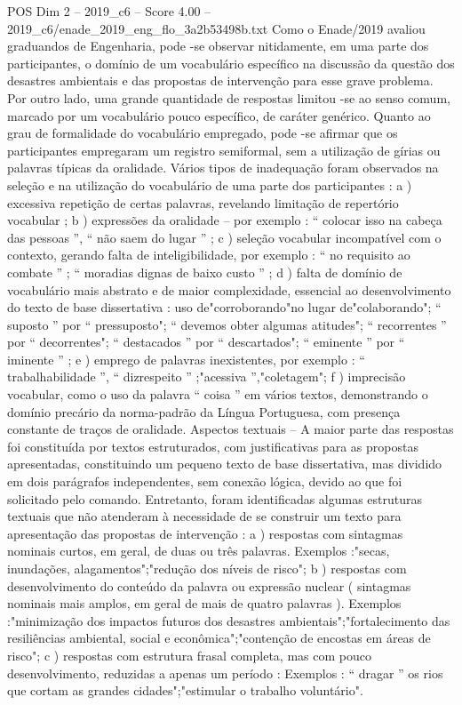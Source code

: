 \begin{textsample}{POS Dim 2 – 2019\_c6 – Score 4.00 – 2019\_c6/enade\_2019\_eng\_flo\_3a2b53498b.txt}
Como o Enade/2019 avaliou graduandos de Engenharia, pode -se observar nitidamente, em uma parte dos participantes, o domínio de um vocabulário específico na discussão da questão dos desastres ambientais e das propostas de intervenção para esse grave problema.
Por outro lado, uma grande quantidade de respostas limitou -se ao senso comum, marcado por um vocabulário pouco específico, de caráter genérico.
Quanto ao grau de formalidade do vocabulário empregado, pode -se afirmar que os participantes empregaram um registro semiformal, sem a utilização de gírias ou palavras típicas da oralidade.
Vários tipos de inadequação foram observados na seleção e na utilização do vocabulário de uma parte dos participantes : a ) excessiva repetição de certas palavras, revelando limitação de repertório vocabular ; b ) expressões da oralidade – por exemplo : “ colocar isso na cabeça das pessoas ”, “ não saem do lugar ” ; c ) seleção vocabular incompatível com o contexto, gerando falta de inteligibilidade, por exemplo : “ no requisito ao combate ” ; “ moradias dignas de baixo custo ” ; d ) falta de domínio de vocabulário mais abstrato e de maior complexidade, essencial ao desenvolvimento do texto de base dissertativa : uso de"corroborando"no lugar de"colaborando"; “ suposto ” por “ pressuposto"; “ devemos obter algumas atitudes"; “ recorrentes ” por “ decorrentes"; “ destacados ” por “ descartados"; “ eminente ” por “ iminente ” ; e ) emprego de palavras inexistentes, por exemplo : “ trabalhabilidade ”, “ dizrespeito ” ;"acessiva ”,"coletagem"; f ) imprecisão vocabular, como o uso da palavra “ coisa ” em vários textos, demonstrando o domínio precário da norma-padrão da Língua Portuguesa, com presença constante de traços de oralidade.
Aspectos textuais – A maior parte das respostas foi constituída por textos estruturados, com justificativas para as propostas apresentadas, constituindo um pequeno texto de base dissertativa, mas dividido em dois parágrafos independentes, sem conexão lógica, devido ao que foi solicitado pelo comando.
Entretanto, foram identificadas algumas estruturas textuais que não atenderam à necessidade de se construir um texto para apresentação das propostas de intervenção : a ) respostas com sintagmas nominais curtos, em geral, de duas ou três palavras.
Exemplos :"secas, inundações, alagamentos";"redução dos níveis de risco"; b ) respostas com desenvolvimento do conteúdo da palavra ou expressão nuclear ( sintagmas nominais mais amplos, em geral de mais de quatro palavras ).
Exemplos :"minimização dos impactos futuros dos desastres ambientais";"fortalecimento das resiliências ambiental, social e econômica";"contenção de encostas em áreas de risco"; c ) respostas com estrutura frasal completa, mas com pouco desenvolvimento, reduzidas a apenas um período : Exemplos : “ dragar ” os rios que cortam as grandes cidades";"estimular o trabalho voluntário".

\end{textsample}

